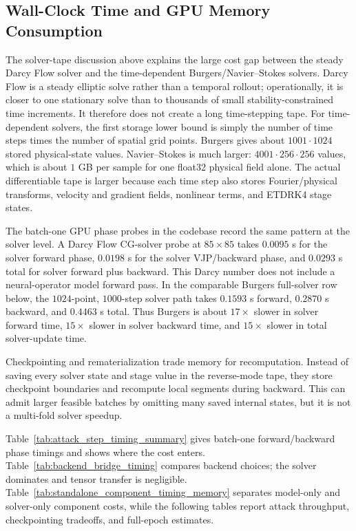 \subsection*{Wall-Clock Time and GPU Memory Consumption}

The solver-tape discussion above explains the large cost gap between the steady
Darcy Flow solver and the time-dependent Burgers/Navier--Stokes solvers. Darcy
Flow is a steady elliptic solve rather than a temporal rollout; operationally,
it is closer to one stationary solve than to thousands of small
stability-constrained time increments. It therefore does not create a long
time-stepping tape. For time-dependent solvers, the first storage lower bound is
simply the number of time steps times the number of spatial grid points. Burgers
gives about $1001\cdot1024$ stored physical-state values. Navier--Stokes is much
larger: $4001\cdot256\cdot256$ values, which is about $1$ GB per sample for one
float32 physical field alone. The actual differentiable tape is larger because
each time step also stores Fourier/physical transforms, velocity and gradient
fields, nonlinear terms, and ETDRK4 stage states.

The batch-one GPU phase probes in the codebase record the same pattern at the
solver level. A Darcy Flow CG-solver probe at $85\times85$ takes $0.0095$ s for
the solver forward phase, $0.0198$ s for the solver VJP/backward phase, and
$0.0293$ s total for solver forward plus backward. This Darcy number does not
include a neural-operator model forward pass. In the comparable Burgers
full-solver row below, the $1024$-point, $1000$-step solver path takes $0.1593$ s
forward, $0.2870$ s backward, and $0.4463$ s total. Thus Burgers is about
$17\times$ slower in solver forward time, $15\times$ slower in solver backward
time, and $15\times$ slower in total solver-update time.

\clearpage
\noindent
\begin{minipage}{\textwidth}
\setlength{\parindent}{1em}
Checkpointing and rematerialization trade memory for recomputation. Instead of
saving every solver state and stage value in the reverse-mode tape, they store
checkpoint boundaries and recompute local segments during backward. This can
admit larger feasible batches by omitting many saved internal states, but it is
not a multi-fold solver speedup.
\end{minipage}\par\smallskip
\begin{minipage}{\textwidth}
\setlength{\parindent}{1em}
Table~\ref{tab:attack_step_timing_summary} gives batch-one forward/backward phase timings and shows where the cost
enters. Table~\ref{tab:backend_bridge_timing} compares backend choices; the solver dominates and tensor
transfer is negligible. Table~\ref{tab:standalone_component_timing_memory} separates model-only and solver-only component
costs, while the following tables report attack throughput, checkpointing
tradeoffs, and full-epoch estimates.
\end{minipage}
\vspace{0.25em}

